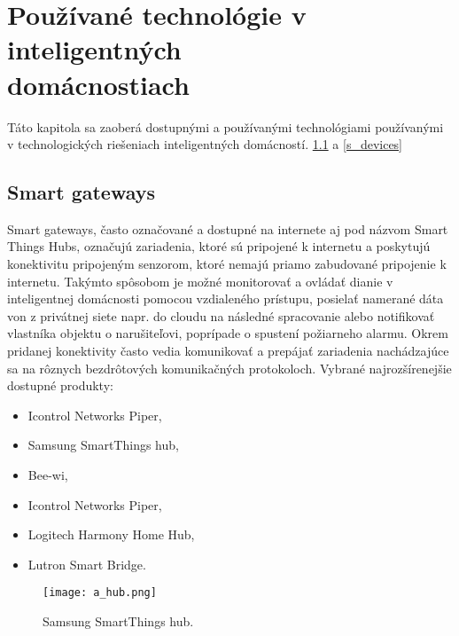 \documentclass[12pt,a4paper,oneside,openright]{report}
\begin{document}

\newpage

\section{Používané technológie v inteligentných \\ domácnostiach} \label{s_solutions}
Táto kapitola sa zaoberá dostupnými a používanými technológiami používanými v technologických riešeniach inteligentných domácností.  \ref{s_smarthubs} a \ref{s_devices}

\subsection{Smart gateways} \label{s_smarthubs}
Smart gateways, často označované a dostupné na internete aj pod názvom Smart Things Hubs, označujú zariadenia, ktoré sú pripojené k internetu a poskytujú konektivitu pripojeným senzorom, ktoré nemajú priamo zabudované pripojenie k internetu. Takýmto spôsobom je možné monitorovať a ovládať dianie v inteligentnej domácnosti pomocou vzdialeného prístupu, posielať namerané dáta von z privátnej siete napr. do cloudu na následné spracovanie alebo notifikovať vlastníka objektu o narušiteľovi, poprípade o spustení požiarneho alarmu. Okrem pridanej konektivity často vedia komunikovať a prepájať zariadenia nachádzajúce sa na rôznych bezdrôtových komunikačných protokoloch.
Vybrané najrozšírenejšie dostupné produkty:
\begin{itemize}
	\item Icontrol Networks Piper,
	\item Samsung SmartThings hub,
	\item Bee-wi,
	\item Icontrol Networks Piper,
	\item Logitech Harmony Home Hub,
	\item Lutron Smart Bridge.
\end{itemize}
\onehalfspacing

\begin{figure*}[h]
	\centering
	\texttt{[image: a\_hub.png]}
	\caption{Samsung SmartThings hub.\cite{hub}}
	\label{f:o_hub}
\end{figure*}
\end{document}
